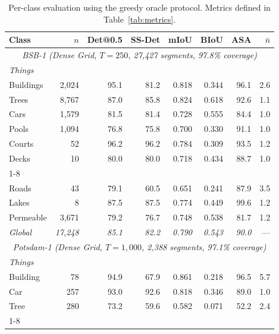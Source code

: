 \documentclass[review,11pt,authoryear]{elsarticle}
\begin{document}
\begin{table}[htbp]
\centering
\caption{Per-class evaluation using the greedy oracle protocol. Metrics defined in Table~\ref{tab:metrics}.}
\label{tab:perobject}
\scriptsize
\begin{tabular*}{\textwidth}{@{\extracolsep{\fill}}lrrrrrrr}
\toprule
Class & $n$ & Det@0.5 & SS-Det & mIoU & BIoU & ASA & $\bar{n}$ \\
\midrule
\multicolumn{8}{c}{\footnotesize\textit{BSB-1 (Dense Grid, $T = 250$, 27{,}427 segments, 97.8\% coverage)}} \\
\midrule
\multicolumn{8}{l}{\scriptsize\textit{Things}} \\
Buildings   & 2{,}024 & 95.1 & 81.2 & 0.818 & 0.344 & 96.1 & 2.6 \\
Trees       & 8{,}767 & 87.0 & 85.8 & 0.824 & 0.618 & 92.6 & 1.1 \\
Cars        & 1{,}579 & 81.5 & 81.4 & 0.728 & 0.555 & 84.4 & 1.0 \\
Pools       & 1{,}094 & 76.8 & 75.8 & 0.700 & 0.330 & 91.1 & 1.0 \\
Courts      &      52 & 96.2 & 96.2 & 0.784 & 0.309 & 93.5 & 1.2 \\
Decks       &      10 & 80.0 & 80.0 & 0.718 & 0.434 & 88.7 & 1.0 \\
\cmidrule{1-8}
\multicolumn{8}{l}{\scriptsize\textit{Stuff}} \\
Roads       &      43 & 79.1 & 60.5 & 0.651 & 0.241 & 87.9 & 3.5 \\
Lakes       &       8 & 87.5 & 87.5 & 0.774 & 0.449 & 99.6 & 1.2 \\
Permeable   & 3{,}671 & 79.2 & 76.7 & 0.748 & 0.538 & 81.7 & 1.2 \\
\textit{Global} & \textit{17{,}248} & \textit{85.1} & \textit{82.2} & \textit{0.790} & \textit{0.543} & \textit{90.0} & --- \\
\midrule
\multicolumn{8}{c}{\footnotesize\textit{Potsdam-1 (Dense Grid, $T = 1{,}000$, 2{,}388 segments, 97.1\% coverage)}} \\
\midrule
\multicolumn{8}{l}{\scriptsize\textit{Things}} \\
Building    &      78 & 94.9 & 67.9 & 0.861 & 0.218 & 96.5 & 5.7 \\
Car         &     257 & 93.0 & 92.6 & 0.818 & 0.346 & 89.0 & 1.0 \\
Tree        &     280 & 73.2 & 59.6 & 0.582 & 0.071 & 52.2 & 2.4 \\
\cmidrule{1-8}
\multicolumn{8}{l}{\scriptsize\textit{Stuff}} \\

\end{tabular*}
\end{table}
\end{document}
